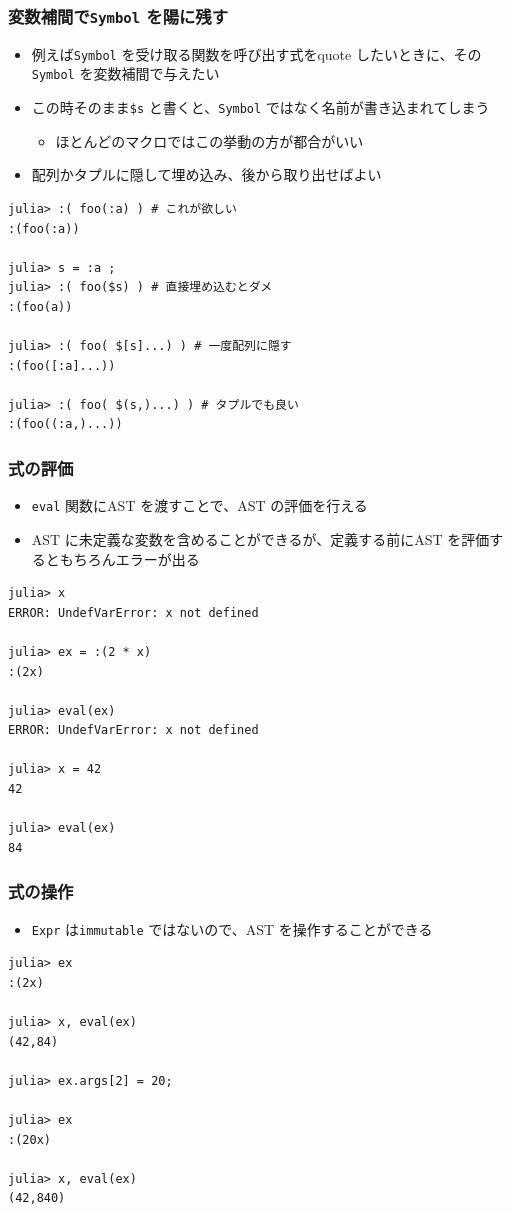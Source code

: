\begin{frame}[containsverbatim]
\frametitle{変数補間で\texttt{Symbol} を陽に残す}
\begin{itemize}
  \item 例えば\verb|Symbol| を受け取る関数を呼び出す式をquote したいときに、その\verb|Symbol| を変数補間で与えたい
  \item この時そのまま\verb|$s| と書くと、\verb|Symbol| ではなく名前が書き込まれてしまう
    \begin{itemize}
      \item ほとんどのマクロではこの挙動の方が都合がいい
    \end{itemize}
  \item 配列かタプルに隠して埋め込み、後から取り出せばよい
\end{itemize}

\begin{lstlisting}
julia> :( foo(:a) ) # これが欲しい
:(foo(:a))

julia> s = :a ;
julia> :( foo($s) ) # 直接埋め込むとダメ
:(foo(a))

julia> :( foo( $[s]...) ) # 一度配列に隠す
:(foo([:a]...))

julia> :( foo( $(s,)...) ) # タプルでも良い
:(foo((:a,)...))
\end{lstlisting}

\end{frame}

\begin{frame}[containsverbatim]
\frametitle{式の評価}
\begin{itemize}
  \item \verb|eval| 関数にAST を渡すことで、AST の評価を行える
  \item AST に未定義な変数を含めることができるが、定義する前にAST を評価するともちろんエラーが出る
\end{itemize}
\begin{lstlisting}
julia> x
ERROR: UndefVarError: x not defined

julia> ex = :(2 * x)
:(2x)

julia> eval(ex)
ERROR: UndefVarError: x not defined

julia> x = 42
42

julia> eval(ex)
84
\end{lstlisting}
\end{frame}

\begin{frame}[containsverbatim]
\frametitle{式の操作}
\begin{itemize}
  \item \verb|Expr| は\verb|immutable| ではないので、AST を操作することができる
\end{itemize}
\begin{lstlisting}
julia> ex
:(2x)

julia> x, eval(ex)
(42,84)

julia> ex.args[2] = 20;

julia> ex
:(20x)

julia> x, eval(ex)
(42,840)
\end{lstlisting}
\end{frame}

